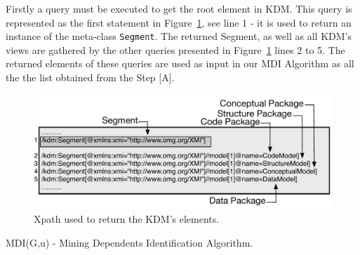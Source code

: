 
Firstly a query must be executed to get the root element in KDM. This query is represented as the first statement in Figure~\ref{fig:queriesXPath}, see line 1 - it is used to return an instance of the meta-class \texttt{Segment}. The returned Segment, as well as all KDM's views are gathered by the other queries presented in Figure~\ref{fig:queriesXPath} lines 2 to 5. The returned elements of these queries are used as input in our MDI Algorithm as all the the list obtained from the Step [A].

\begin{figure}[h]
	\centering
	\includegraphics[scale=0.479]{figuras/queiresANDATLSBESNew}
	\caption{Xpath used to return the KDM's elements.}
	\label{fig:queriesXPath}
\end{figure}


\begin{algorithm}[h]
     \SetAlgoLined
     \caption{MDI(G,u) - Mining Dependents Identification Algorithm.}
     \label{alg:death1}
   \end{algorithm}

